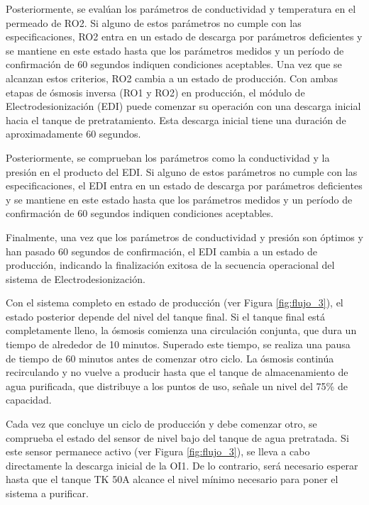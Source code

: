 Posteriormente, se evalúan los parámetros de conductividad y temperatura en el permeado de RO2.
Si alguno de estos parámetros no cumple con las especificaciones, RO2 entra en un estado de descarga
por parámetros deficientes y se mantiene en este estado hasta que los parámetros medidos y un período
de confirmación de 60 segundos indiquen condiciones aceptables.
Una vez que se alcanzan estos criterios, RO2 cambia a un estado de producción. Con ambas etapas de
ósmosis inversa (RO1 y RO2) en producción, el módulo de Electrodesionización (EDI) puede comenzar su
operación con una descarga inicial hacia el tanque de pretratamiento. Esta descarga inicial tiene
una duración de aproximadamente 60 segundos.

Posteriormente, se comprueban los parámetros como la conductividad y la presión en el producto del EDI.
Si alguno de estos parámetros no cumple con las especificaciones, el EDI entra en un estado de descarga
por parámetros deficientes y se mantiene en este estado hasta que los parámetros medidos y un período
de confirmación de 60 segundos indiquen condiciones aceptables.

Finalmente, una vez que los parámetros de conductividad y presión son óptimos y han pasado 60 segundos
de confirmación, el EDI cambia a un estado de producción, indicando la finalización exitosa de la
secuencia operacional del sistema de Electrodesionización.

Con el sistema completo en estado de producción (ver Figura \ref{fig:flujo_3}), el estado
posterior depende del nivel del tanque final. Si el tanque final está
completamente lleno, la ósmosis comienza una circulación conjunta, que dura un
tiempo de alrededor de 10 minutos. Superado este tiempo, se realiza una pausa de tiempo de 60 minutos antes de
comenzar otro ciclo. La ósmosis continúa recirculando y no vuelve a producir
hasta que el tanque de almacenamiento de agua purificada, que distribuye a los
puntos de uso, señale un nivel del 75\% de capacidad.

Cada vez que concluye un ciclo de producción y debe comenzar otro, se comprueba
el estado del sensor de nivel bajo del tanque de agua pretratada. Si este
sensor permanece activo (ver Figura \ref{fig:flujo_3}), se lleva a cabo directamente la
descarga inicial de la OI1. De lo contrario, será necesario esperar hasta que
el tanque TK 50A alcance el nivel mínimo necesario para poner el sistema a purificar.
